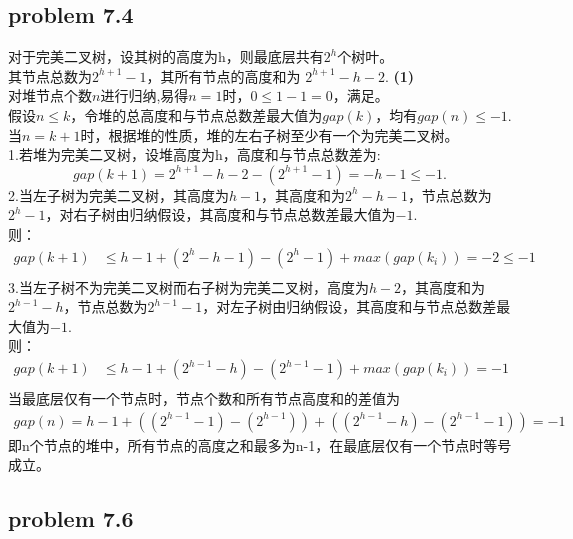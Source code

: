 \documentclass[11pt]{ctexart}
\begin{document}
	\subsection*{problem 7.4}
	对于完美二叉树，设其树的高度为h，则最底层共有$2^h$个树叶。\\
	其节点总数为$2^{h+1}-1$，其所有节点的高度和为
	$2^{h+1}-h-2.$  \textbf{(1)}\\
	\hspace*{20pt}对堆节点个数$n$进行归纳,易得$n=1时，0\leq1-1=0$，满足。\\
		\hspace*{20pt}假设$n\leq k$，令堆的总高度和与节点总数差最大值为$gap(k)$，均有$gap(n)\leq-1.$\\
		\hspace*{20pt}当$n=k+1$时，根据堆的性质，堆的左右子树至少有一个为完美二叉树。\\
		\hspace*{20pt}1.若堆为完美二叉树，设堆高度为h，高度和与节点总数差为:\\
		$$
		gap(k+1)=2^{h+1}-h-2-(2^{h+1}-1)=-h-1\leq-1.
		$$
		\hspace*{20pt}2.当左子树为完美二叉树，其高度为$h-1$，其高度和为$2^{h}-h-1$，节点总数为$2^{h}-1$，对右子树由归纳假设，其高度和与节点总数差最大值为$-1$.\\
	则：$$\begin{aligned}
	gap(k+1)&\leq h-1+(2^{h}-h-1)-(2^{h}-1)+max(gap(k_i))=-2\leq -1\\
	\end{aligned}
	$$
	\hspace*{20pt}3.当左子树不为完美二叉树而右子树为完美二叉树，高度为$h-2$，其高度和为$2^{h-1}-h$，节点总数为$2^{h-1}-1$，对左子树由归纳假设，其高度和与节点总数差最大值为$-1$.\\
	则：
	$$\begin{aligned}
	gap(k+1)&\leq h-1+(2^{h-1}-h)-(2^{h-1}-1)+max(gap(k_i))=-1\\
	\end{aligned}
	$$
	\hspace*{20pt}当最底层仅有一个节点时，节点个数和所有节点高度和的差值为
	$$\begin{aligned}
	gap(n)=h-1+((2^{h-1}-1)-(2^{h-1}))+((2^{h-1}-h)-(2^{h-1}-1))=-1
	\end{aligned}
	$$
	\hspace*{20pt}即n个节点的堆中，所有节点的高度之和最多为n-1，在最底层仅有一个节点时等号成立。

	\subsection*{problem 7.6}	
\end{document}
